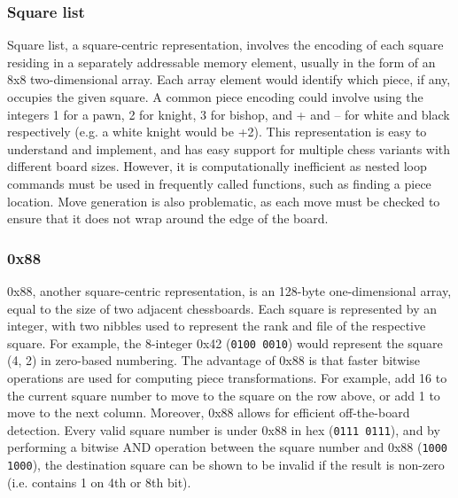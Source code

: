 \documentclass[../main/main.tex]{subfiles}
\begin{document}
\subsubsection*{Square list}
Square list, a square-centric representation, involves the encoding of each square residing in a separately addressable memory element, usually in the form of an 8x8 two-dimensional array. Each array element would identify which piece, if any, occupies the given square. A common piece encoding could involve using the integers 1 for a pawn, 2 for knight, 3 for bishop, and + and – for white and black respectively (e.g. a white knight would be +2). This representation is easy to understand and implement, and has easy support for multiple chess variants with different board sizes. However, it is computationally inefficient as nested loop commands must be used in frequently called functions, such as finding a piece location. Move generation is also problematic, as each move must be checked to ensure that it does not wrap around the edge of the board.

\subsubsection*{0x88}
0x88, another square\hyp{}centric representation, is an 128\hyp{}byte one\hyp{}dimensional array, equal to the size of two adjacent chessboards. Each square is represented by an integer, with two nibbles used to represent the rank and file of the respective square. For example, the 8\hyp{}integer 0x42 (\lstinline{0100 0010}) would represent the square (4, 2) in zero\hyp{}based numbering. The advantage of 0x88 is that faster bitwise operations are used for computing piece transformations. For example, add 16 to the current square number to move to the square on the row above, or add 1 to move to the next column. Moreover, 0x88 allows for efficient off\hyp{}the\hyp{}board detection. Every valid square number is under 0x88 in hex (\lstinline{0111 0111}), and by performing a bitwise AND operation between the square number and 0x88 (\lstinline{1000 1000}), the destination square can be shown to be invalid if the result is non\hyp{}zero (i.e. contains 1 on 4th or 8th bit).
\end{document}
